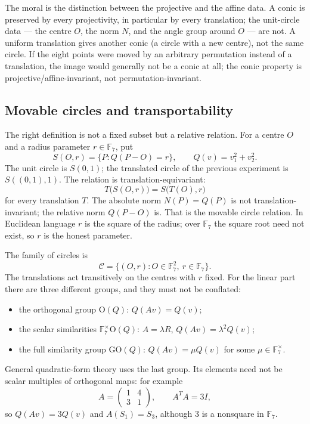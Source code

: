 \documentclass[11pt]{article}
\theoremstyle{definition}
\theoremstyle{remark}
\newcommand{\F}{\mathbb{F}}
\begin{document}
The moral is the distinction between the projective and the affine data.  A
conic is preserved by every projectivity, in particular by every translation;
the unit-circle data --- the centre $O$, the norm $N$, and the angle group
around $O$ --- are not.  A uniform translation gives another conic (a circle
with a new centre), not the same circle.  If the eight points were moved by an
arbitrary permutation instead of a translation, the image would generally not
be a conic at all; the conic property is projective/affine-invariant, not
permutation-invariant.

\subsection{Movable circles and transportability}
\label{subsec:movable}

The right definition is not a fixed subset but a relative relation.  For a centre
$O$ and a radius parameter $r\in\F_7$, put
\[
  S(O,r)=\{P:Q(P-O)=r\},\qquad Q(v)=v_1^2+v_2^2 .
\]
The unit circle is $S(0,1)$; the translated circle of the previous experiment is
$S((0,1),1)$.  The relation is translation-equivariant:
\[
  T\bigl(S(O,r)\bigr)=S\bigl(T(O),r\bigr)
\]
for every translation $T$.  The absolute norm $N(P)=Q(P)$ is not
translation-invariant; the relative norm $Q(P-O)$ is.  That is the movable
circle relation.  In Euclidean language $r$ is the square of the radius; over
$\F_7$ the square root need not exist, so $r$ is the honest parameter.

The family of circles is
\[
  \mathcal C=\{(O,r):O\in\F_7^2,\ r\in\F_7\}.
\]
The translations act transitively on the centres with $r$ fixed.  For the
linear part there are three different groups, and they must not be conflated:
\begin{itemize}
  \item the orthogonal group $\mathrm O(Q)$: $Q(Av)=Q(v)$;
  \item the scalar similarities $\F_7^\times\mathrm O(Q)$: $A=\lambda R$,
        $Q(Av)=\lambda^2Q(v)$;
  \item the full similarity group $\mathrm{GO}(Q)$: $Q(Av)=\mu Q(v)$ for some
        $\mu\in\F_7^\times$.
\end{itemize}
General quadratic-form theory uses the last group.  Its elements need not be
scalar multiples of orthogonal maps: for example
\[
  A=\begin{pmatrix}1&4\\3&1\end{pmatrix},
  \qquad A^{T}A=3I,
\]
so $Q(Av)=3Q(v)$ and $A(S_1)=S_3$, although $3$ is a nonsquare in $\F_7$.
\end{document}
